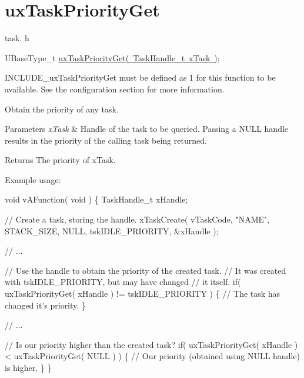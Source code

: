 \hypertarget{group__ux_task_priority_get}{}\section{ux\+Task\+Priority\+Get}
\label{group__ux_task_priority_get}
task. h 
\begin{DoxyPre}UBaseType\_t \mbox{\hyperlink{task_8h_a3edc3f1a0adc8403f42529bce4ae3446}{uxTaskPriorityGet( TaskHandle\_t xTask )}};\end{DoxyPre}


I\+N\+C\+L\+U\+D\+E\+\_\+ux\+Task\+Priority\+Get must be defined as 1 for this function to be available. See the configuration section for more information.

Obtain the priority of any task.


\begin{DoxyParams}{Parameters}
{\em x\+Task} & Handle of the task to be queried. Passing a N\+U\+LL handle results in the priority of the calling task being returned.\\
\hline
\end{DoxyParams}
\begin{DoxyReturn}{Returns}
The priority of x\+Task.
\end{DoxyReturn}
Example usage\+: 
\begin{DoxyPre}
void vAFunction( void )
\{
TaskHandle\_t xHandle;\end{DoxyPre}



\begin{DoxyPre}    // Create a task, storing the handle.
    xTaskCreate( vTaskCode, "NAME", STACK\_SIZE, NULL, tskIDLE\_PRIORITY, \&xHandle );\end{DoxyPre}



\begin{DoxyPre}    // ...\end{DoxyPre}



\begin{DoxyPre}    // Use the handle to obtain the priority of the created task.
    // It was created with tskIDLE\_PRIORITY, but may have changed
    // it itself.
    if( uxTaskPriorityGet( xHandle ) != tskIDLE\_PRIORITY )
    \{
     // The task has changed it's priority.
    \}\end{DoxyPre}



\begin{DoxyPre}    // ...\end{DoxyPre}



\begin{DoxyPre}    // Is our priority higher than the created task?
    if( uxTaskPriorityGet( xHandle ) < uxTaskPriorityGet( NULL ) )
    \{
     // Our priority (obtained using NULL handle) is higher.
    \}
\}
  \end{DoxyPre}
 